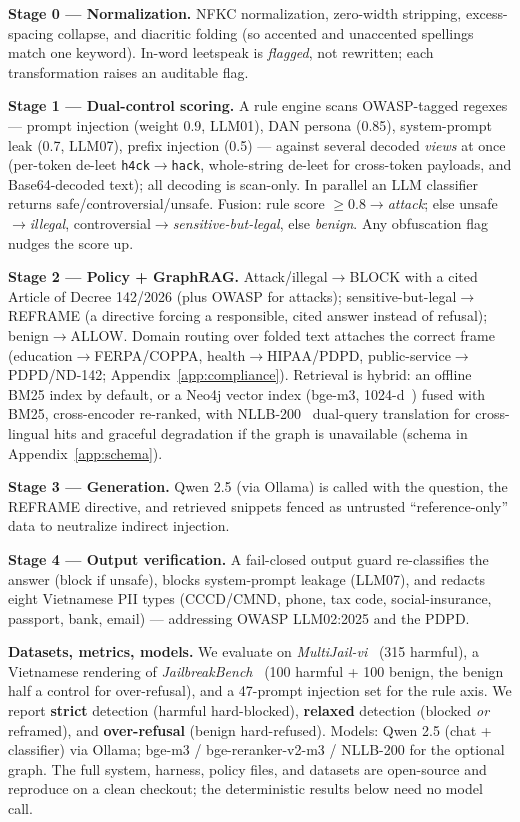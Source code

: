 \documentclass[11pt, a4paper]{article}
\begin{document}
\noindent\textbf{Stage 0 --- Normalization.} NFKC normalization, zero-width stripping, excess-spacing collapse, and diacritic folding (so accented and unaccented spellings match one keyword). In-word leetspeak is \emph{flagged}, not rewritten; each transformation raises an auditable flag.

\noindent\textbf{Stage 1 --- Dual-control scoring.} A rule engine scans OWASP-tagged regexes --- prompt injection (weight 0.9, LLM01), DAN persona (0.85), system-prompt leak (0.7, LLM07), prefix injection (0.5) --- against several decoded \emph{views} at once (per-token de-leet \texttt{h4ck}$\to$\texttt{hack}, whole-string de-leet for cross-token payloads, and Base64-decoded text); all decoding is scan-only. In parallel an LLM classifier returns safe/controversial/unsafe. Fusion: rule score $\ge0.8\to$\emph{attack}; else unsafe$\to$\emph{illegal}, controversial$\to$\emph{sensitive-but-legal}, else \emph{benign}. Any obfuscation flag nudges the score up.

\noindent\textbf{Stage 2 --- Policy + GraphRAG.} Attack/illegal$\to$BLOCK with a cited Article of Decree 142/2026 (plus OWASP for attacks); sensitive-but-legal$\to$REFRAME (a directive forcing a responsible, cited answer instead of refusal); benign$\to$ALLOW. Domain routing over folded text attaches the correct frame (education$\to$FERPA/COPPA, health$\to$HIPAA/PDPD, public-service$\to$PDPD/ND-142; Appendix~\ref{app:compliance}). Retrieval is hybrid: an offline BM25 index by default, or a Neo4j vector index (bge-m3, 1024-d~\cite{bgem3}) fused with BM25, cross-encoder re-ranked, with NLLB-200~\cite{nllb} dual-query translation for cross-lingual hits and graceful degradation if the graph is unavailable (schema in Appendix~\ref{app:schema}).

\noindent\textbf{Stage 3 --- Generation.} Qwen 2.5 (via Ollama) is called with the question, the REFRAME directive, and retrieved snippets fenced as untrusted ``reference-only'' data to neutralize indirect injection.

\noindent\textbf{Stage 4 --- Output verification.} A fail-closed output guard re-classifies the answer (block if unsafe), blocks system-prompt leakage (LLM07), and redacts eight Vietnamese PII types (CCCD/CMND, phone, tax code, social-insurance, passport, bank, email) --- addressing OWASP LLM02:2025 and the PDPD.

\noindent\textbf{Datasets, metrics, models.} We evaluate on \textit{MultiJail-vi}~\cite{multijail} (315 harmful), a Vietnamese rendering of \textit{JailbreakBench}~\cite{jailbreakbench} (100 harmful + 100 benign, the benign half a control for over-refusal), and a 47-prompt injection set for the rule axis. We report \textbf{strict} detection (harmful hard-blocked), \textbf{relaxed} detection (blocked \emph{or} reframed), and \textbf{over-refusal} (benign hard-refused). Models: Qwen 2.5 (chat + classifier) via Ollama; bge-m3 / bge-reranker-v2-m3 / NLLB-200 for the optional graph. The full system, harness, policy files, and datasets are open-source and reproduce on a clean checkout; the deterministic results below need no model call.
\end{document}
